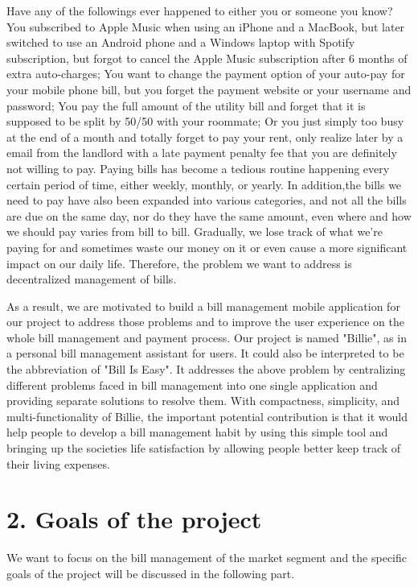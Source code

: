 \documentclass{sigchi}
\begin{document}
Have any of the followings ever happened to either you or someone you know? You subscribed to Apple Music when using an iPhone and a MacBook, but later switched to use an Android phone and a Windows laptop with Spotify subscription, but forgot to cancel the Apple Music subscription after 6 months of extra auto-charges; You want to change the payment option of your auto-pay for your mobile phone bill, but you forget the payment website or your username and password; You pay the full amount of the utility bill and forget that it is supposed to be split by 50/50 with your roommate; Or you just simply too busy at the end of a month and totally forget to pay your rent, only realize later by a email from the landlord with a late payment penalty fee that you are definitely not willing to pay. Paying bills has become a tedious routine happening every certain period of time, either weekly, monthly, or yearly. In addition,the bills we need to pay have also been expanded into various categories, and not all the bills are due on the same day, nor do they have the same amount, even where and how we should pay varies from bill to bill. Gradually, we lose track of what we're paying for and sometimes waste our money on it or even cause a more significant impact on our daily life. Therefore, the problem we want to address is decentralized management of bills. 

As a result, we are motivated to build a bill management mobile application for our project to address those problems and to improve the user experience on the whole bill management and payment process. Our project is named "Billie", as in a personal bill management assistant for users. It could also be interpreted to be the abbreviation of "Bill Is Easy". It addresses the above problem by centralizing different problems faced in bill management into one single application and providing separate solutions to resolve them. With compactness, simplicity, and multi-functionality of Billie, the important potential contribution is that it would help people to develop a bill management habit by using this simple tool and bringing up the societies life satisfaction by allowing people better keep track of their living expenses. 

\section{2. Goals of the project}

We want to focus on the bill management of the market segment and the specific goals of the project will be discussed in the following part. 
\end{document}
